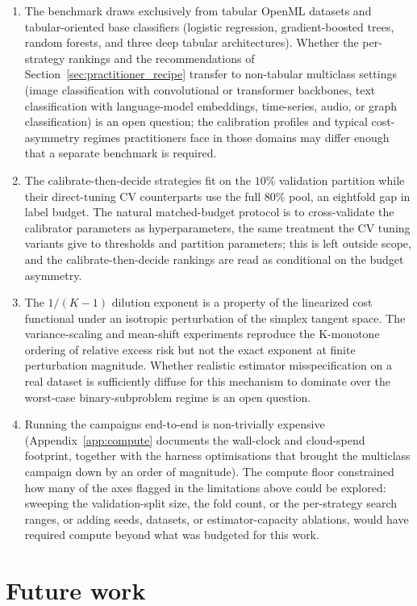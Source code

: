 \begin{enumerate}
    \item The benchmark draws exclusively from tabular OpenML datasets and tabular-oriented base classifiers (logistic regression, gradient-boosted trees, random forests, and three deep tabular architectures). Whether the per-strategy rankings and the recommendations of Section~\ref{sec:practitioner_recipe} transfer to non-tabular multiclass settings (image classification with convolutional or transformer backbones, text classification with language-model embeddings, time-series, audio, or graph classification) is an open question; the calibration profiles and typical cost-asymmetry regimes practitioners face in those domains may differ enough that a separate benchmark is required.
    \item The calibrate-then-decide strategies fit on the $10\%$ validation partition while their direct-tuning CV counterparts use the full $80\%$ pool, an eightfold gap in label budget. The natural matched-budget protocol is to cross-validate the calibrator parameters as hyperparameters, the same treatment the CV tuning variants give to thresholds and partition parameters; this is left outside scope, and the calibrate-then-decide rankings are read as conditional on the budget asymmetry.
    \item The $1/(K-1)$ dilution exponent is a property of the linearized cost functional under an isotropic perturbation of the simplex tangent space. The variance-scaling and mean-shift experiments reproduce the K-monotone ordering of relative excess risk but not the exact exponent at finite perturbation magnitude. Whether realistic estimator misspecification on a real dataset is sufficiently diffuse for this mechanism to dominate over the worst-case binary-subproblem regime is an open question.
    \item Running the campaigns end-to-end is non-trivially expensive (Appendix~\ref{app:compute} documents the wall-clock and cloud-spend footprint, together with the harness optimisations that brought the multiclass campaign down by an order of magnitude). The compute floor constrained how many of the axes flagged in the limitations above could be explored: sweeping the validation-split size, the fold count, or the per-strategy search ranges, or adding seeds, datasets, or estimator-capacity ablations, would have required compute beyond what was budgeted for this work.
\end{enumerate}

\section{Future work}

